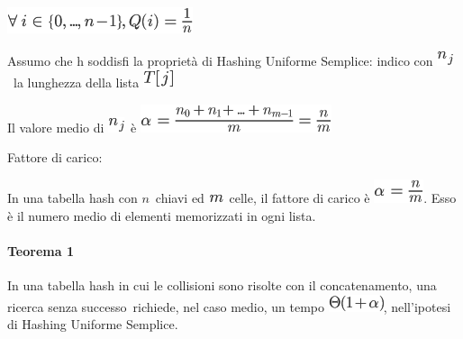 \documentclass{article}
\let\oldparagraph\paragraph
\renewcommand{\paragraph}[1]{\oldparagraph{#1}\mbox{}}
\begin{document}
\includegraphics{images/image242.png}

{}

{Assumo che h soddisfi la proprietà di Hashing Uniforme Semplice: indico
con }\includegraphics{images/image243.png}{~la lunghezza della lista
}\includegraphics{images/image244.png}

{}

{Il valore medio di }\includegraphics{images/image243.png}{~è
}\includegraphics{images/image245.png}

{}

{Fattore di carico: }

{In una tabella hash con }$n${~chiavi
ed }\includegraphics{images/image235.png}{~celle, il fattore di carico è
}\includegraphics{images/image246.png}{. Esso è il numero medio di
elementi memorizzati in ogni lista.}

{}

\hypertarget{h.coagge9vpuqt}{\paragraph{\texorpdfstring{{Teorema
1}}{Teorema 1}}\label{h.coagge9vpuqt}}

{In una tabella hash in cui le collisioni sono risolte con il
concatenamento, una }{ricerca senza successo}{~richiede, nel caso medio,
un tempo }\includegraphics{images/image247.png}{, nell'ipotesi di
Hashing Uniforme Semplice.}

{}
\end{document}
